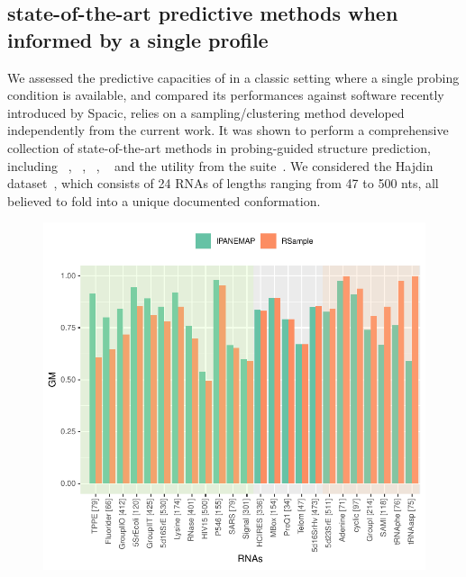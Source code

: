 \documentclass[a4,center,fleqn]{NAR}
\begin{document}
 







\subsection*{\OurTool{}  state-of-the-art predictive methods when informed by a single profile}
We assessed the predictive capacities of \OurTool in a classic setting where a single probing condition is available, and compared its performances against  software recently introduced by Spacic\etal\cite{Spasic2017},  relies on a sampling/clustering method developed independently from the current work. It was shown to perform  a comprehensive collection of state-of-the-art methods in probing-guided structure prediction, including ~\citep{Wu2015}, ~\citep{Deng2016}, ~\citep{Washietl2012}, ~\citep{Zarringhalam2012} and the  utility from the  suite~\citep{Reuter2010}.
We considered the Hajdin dataset~\cite{Hajdin2013}, which consists of 24 RNAs of lengths ranging from 47 to 500 nts, all believed to fold into a unique documented conformation. 

\begin{figure}
	\includegraphics[width=\linewidth]{graphs/RsampleVsIPANEMAP/Accuracy}
	\caption{ \label{fig:Vsrsample}}
\end{figure}
\end{document}

